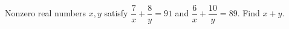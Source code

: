 Nonzero real numbers $x,y$ satisfy $\dfrac{7}{x}+\dfrac{8}{y}=91$ and $\dfrac{6}{x}+\dfrac{10}{y}=89$. Find $x+y$.
